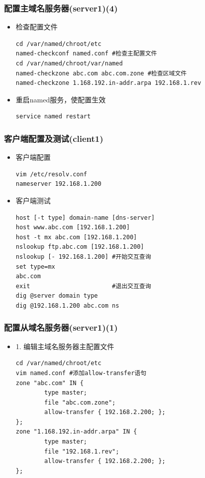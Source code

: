 \documentclass[xcolor=svgnames,presentation]{beamer}
\begin{document}
\begin{frame}[fragile]
\frametitle{配置主域名服务器(server1)(4)}
\label{sec-1-10}
\begin{itemize}

\item 检查配置文件\\
\label{sec-1-10-1}%
\begin{verbatim}
cd /var/named/chroot/etc
named-checkconf named.conf #检查主配置文件
cd /var/named/chroot/var/named
named-checkzone abc.com abc.com.zone #检查区域文件
named-checkzone 1.168.192.in-addr.arpa 192.168.1.rev
\end{verbatim}

\item 重启named服务，使配置生效\\
\label{sec-1-10-2}%
\begin{verbatim}
service named restart
\end{verbatim}
\end{itemize} %
\end{frame}
\begin{frame}[fragile]
\frametitle{客户端配置及测试(client1)}
\label{sec-1-11}
\begin{itemize}

\item 客户端配置\\
\label{sec-1-11-1}%
\begin{verbatim}
vim /etc/resolv.conf
nameserver 192.168.1.200
\end{verbatim}

\item 客户端测试\\
\label{sec-1-11-2}%
\begin{verbatim}
host [-t type] domain-name [dns-server]
host www.abc.com [192.168.1.200]
host -t mx abc.com [192.168.1.200]
nslookup ftp.abc.com [192.168.1.200]
nslookup [- 192.168.1.200] #开始交互查询
set type=mx
abc.com
exit                       #退出交互查询
dig @server domain type
dig @192.168.1.200 abc.com ns
\end{verbatim}
\end{itemize} %
\end{frame}
\begin{frame}[fragile]
\frametitle{配置从域名服务器(server1)(1)}
\label{sec-1-12}
\begin{itemize}

\item 1. 编辑主域名服务器主配置文件\\
\label{sec-1-12-1}%
\begin{verbatim}
cd /var/named/chroot/etc
vim named.conf #添加allow-transfer语句
zone "abc.com" IN {
        type master;
        file "abc.com.zone";
        allow-transfer { 192.168.2.200; };
};
zone "1.168.192.in-addr.arpa" IN {
        type master;
        file "192.168.1.rev";
        allow-transfer { 192.168.2.200; };
};
\end{verbatim}
\end{itemize} %
\end{frame}
\end{document}
